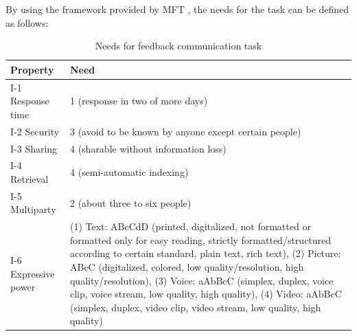 \documentclass[english,12pt,a4paper,pdftex]{article}
\begin{document}
By using the framework provided by \ac{MFT} \citep{higa2007}, the needs for the task can be defined as follows:

\begin{table}[!h]
\renewcommand{\arraystretch}{1.3}
\caption{Needs for feedback communication task}
\label{table:needs_for_feedback_communication_task}
\centering
\begin{tabular}{|p{7cm}|p{7cm}|}
\hline
\textbf{Property} & \textbf{Need}\\
\hline
I-1 Response time & 1 (response in two of more days) \\
\hline
I-2 Security & 3 (avoid to be known by anyone except certain people) \\
\hline
I-3 Sharing & 4 (sharable without information loss) \\
\hline
I-4 Retrieval & 4 (semi-automatic indexing) \\
\hline
I-5 Multiparty & 2 (about three to six people) \\
\hline
I-6 Expressive power & (1) Text: ABcCdD (printed, digitalized, not formatted or formatted only for easy reading, strictly formatted/structured according to certain standard, plain text, rich text), (2) Picture: ABcC (digitalized, colored, low quality/resolution, high quality/resolution), (3) Voice: aAbBcC (simplex, duplex, voice clip, voice stream, low quality, high quality), (4) Video: aAbBcC (simplex, duplex, video clip, video stream, low quality, high quality) \\
\hline
\end{tabular}
\end{table}
\end{document}
